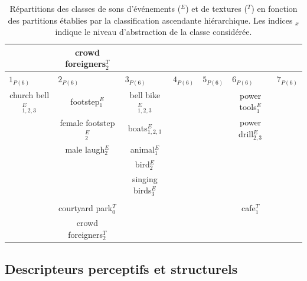 \begin{table}[t]
\begin{tabular}{c|c|c|c|c|c|c}
                         &  crowd foreigners$_2^T$ &                       & \multicolumn{2}{c|}{} &                        &  \\               
\hline
\multicolumn{1}{l|}{$1_{P(6)}$} & \multicolumn{1}{l|}{$2_{P(6)}$} & \multicolumn{1}{l|}{$3_{P(6)}$}  & \multicolumn{1}{l|}{$4_{P(6)}$} & \multicolumn{1}{l|}{$5_{P(6)}$} & \multicolumn{1}{l|}{$6_{P(6)}$} & \multicolumn{1}{l}{$7_{P(6)}$} \\  
church bell$_{1,2,3}^E$  & footstep$_{1}^E$        & bell bike$_{1,2,3}^E$ &     &     & power tools$_1^E$      &   \\        
                         & female footstep$_{2}^E$ & boats$_{1,2,3}^E$     &     &     & power drill$_{2,3}^E$  &  \\  
                         & male laugh$_{2}^E$      & animal$_{1}^E$        &     &     &                        & \\  
                         &                         & bird$_2^E$            &     &     &                        & \\  
                         &                         & singing birds$_3^E$   &     &     &                        & \\  
                         &                         &                       &     &     &                        & \\                            
                         & courtyard park$_0^T$    &                       &     &     & cafe$_1^T$             & \\   
                         & crowd foreigners$_2^T$  &                       &     &     &                        & \\     
\hline

\end{tabular}
\vspace{0.5mm}
\caption[Répartitions des classes de sons en fonction des partitions établies par la classification ascendante hiérarchique]{Répartitions des classes de sons d'événements ($^E$) et de textures ($^T$) en fonction des partitions établies par la classification ascendante hiérarchique. Les indices $_{x}$ indique le niveau d'abstraction de la classe considérée.}
\label{tab:markerHacClass}
\end{table}

\subsection{Descripteurs perceptifs et structurels}

